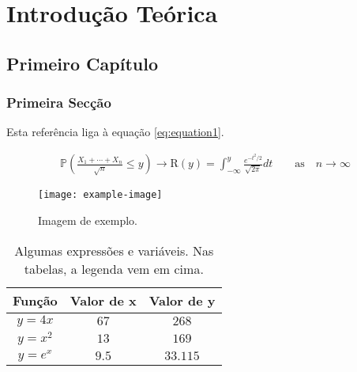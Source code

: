 \documentclass[portuguese]{ist-thesis}
\begin{document}
\lipsum[1] %

\part{Introdução Teórica}

\chapter{Primeiro Capítulo}

\section{Primeira Secção}

Esta referência liga à equação \eqref{eq:equation1}.

\begin{gather}\label{eq:equation1}
	\mathbb{P}\left(\frac{X_1 + \cdots + X_n}{\sqrt{n}} \leq y\right) \rightarrow \mathrm{R}(y) = \int_{-\infty}^{y} \frac{e^{-t^2/2}}{\sqrt{2\pi}}dt \qquad \mathrm{as} \quad n \rightarrow \infty
\end{gather}

\lipsum[2-3] %

\begin{figure}[ht]
	\centering
	\texttt{[image: example-image]}
	\caption{Imagem de exemplo.}
	\label{fig:image1}
\end{figure}

\lipsum[1] %

\begin{table}[ht]
	\centering
	\caption{Algumas expressões e variáveis. Nas tabelas, a legenda vem em cima.}
	\begin{tabular}{c c c}\toprule
		\textbf{Função}		& \textbf{Valor de $\mathbf{x}$}	& \textbf{Valor de $\mathbf{y}$}\\
		\midrule
		$y = 4x$			& $67$								& $268$							\\
		$y = x^2$			& $13$								& $169$							\\
		$y = e^x$			& $9.5$								& $33.115$						\\
		\bottomrule
	\end{tabular}
	\label{tab:tab1}
\end{table}

\lipsum[11] %
\end{document}
